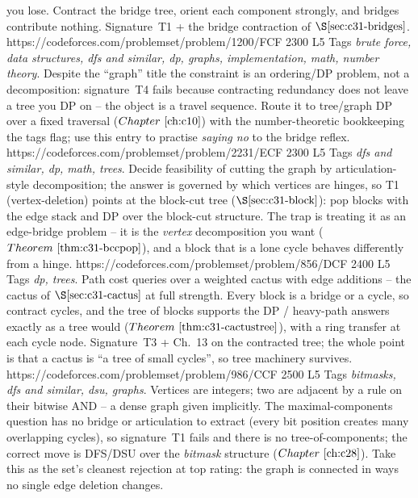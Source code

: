 \begin{mixedset}
{     you lose.  Contract the bridge tree, orient each component strongly, and bridges
     contribute nothing.  Signature~T1 + the bridge contraction of \(\secref{c31-bridges}\).}
    {https://codeforces.com/problemset/problem/1200/F}{CF 2300 L5}
    {Tags \emph{brute force, data structures, dfs and similar, dp, graphs, implementation,
     math, number theory}. Despite the ``graph'' title the constraint is an ordering/DP
     problem, not a decomposition: signature~T4 fails because contracting redundancy does
     not leave a tree you DP on -- the object is a travel sequence.  Route it to tree/graph
     DP over a fixed traversal (\(\chref{c10}\)) with the number-theoretic bookkeeping the
     tags flag; use this entry to practise \emph{saying no} to the bridge reflex.}
    {https://codeforces.com/problemset/problem/2231/E}{CF 2300 L5}
    {Tags \emph{dfs and similar, dp, math, trees}. Decide feasibility of cutting the graph by
     articulation-style decomposition; the answer is governed by which vertices are hinges,
     so T1 (vertex-deletion) points at the block-cut tree (\(\secref{c31-block}\)): pop
     blocks with the edge stack and DP over the block-cut structure.  The trap is treating
     it as an edge-bridge problem -- it is the \emph{vertex} decomposition you want
     (\(\thmref{c31-bccpop}\)), and a block that is a lone cycle behaves differently from a
     hinge.}
    {https://codeforces.com/problemset/problem/856/D}{CF 2400 L5}
    {Tags \emph{dp, trees}. Path cost queries over a weighted cactus with edge additions --
     the cactus of \(\secref{c31-cactus}\) at full strength.  Every block is a bridge or a
     cycle, so contract cycles, and the tree of blocks supports the DP / heavy-path answers
     exactly as a tree would (\(\thmref{c31-cactustree}\)), with a ring transfer at each
     cycle node.  Signature~T3 + Ch.~13 on the contracted tree; the whole point is that a
     cactus is ``a tree of small cycles'', so tree machinery survives.}
    {https://codeforces.com/problemset/problem/986/C}{CF 2500 L5}
    {Tags \emph{bitmasks, dfs and similar, dsu, graphs}. Vertices are integers; two are
     adjacent by a rule on their bitwise AND -- a dense graph given implicitly.  The
     maximal-components question has no bridge or articulation to extract (every bit
     position creates many overlapping cycles), so signature~T1 fails and there is no
     tree-of-components; the correct move is DFS/DSU over the \emph{bitmask} structure
     (\(\chref{c28}\)).  Take this as the set's cleanest rejection at top rating: the graph
     is connected in ways no single edge deletion changes.}
\end{mixedset}

